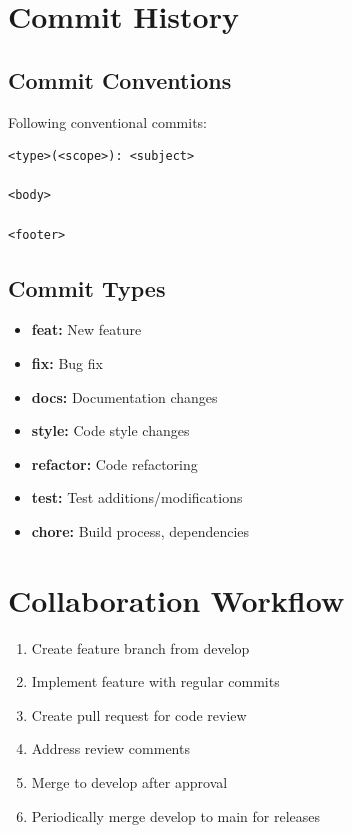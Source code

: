 \section{Commit History}

\subsection{Commit Conventions}

Following conventional commits:

\begin{verbatim}
<type>(<scope>): <subject>

<body>

<footer>
\end{verbatim}

\subsection{Commit Types}

\begin{itemize}
    \item \textbf{feat:} New feature
    \item \textbf{fix:} Bug fix
    \item \textbf{docs:} Documentation changes
    \item \textbf{style:} Code style changes
    \item \textbf{refactor:} Code refactoring
    \item \textbf{test:} Test additions/modifications
    \item \textbf{chore:} Build process, dependencies
\end{itemize}

\section{Collaboration Workflow}

\begin{enumerate}
    \item Create feature branch from develop
    \item Implement feature with regular commits
    \item Create pull request for code review
    \item Address review comments
    \item Merge to develop after approval
    \item Periodically merge develop to main for releases
\end{enumerate}

